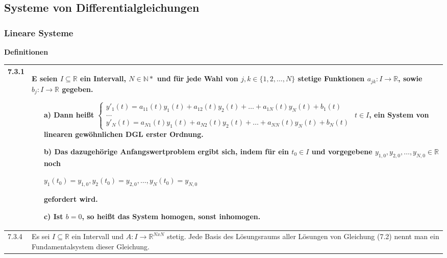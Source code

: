 \subsection{Systeme von Differentialgleichungen}
\subsubsection{Lineare Systeme}

    \noindent
    \textbf{Definitionen}
      
    \begin{longtable}{p{1cm} p{16cm}}
        \toprule

        7.3.1 & E seien $I \subseteq  \mathbb{R}$ ein Intervall, $N \in \mathbb{N*}$ und für jede Wahl von $j,k \in \{1,2,\dots,N\}$ 
            stetige Funktionen $a_{jk}: I \rightarrow \mathbb{R}$, sowie $b_j: I \rightarrow \mathbb{R}$ gegeben. 
            \begin{itemize}[topsep=-0.5cm]
                \item[a)] Dann heißt \hfill \break
                            $\begin{cases}
                                y'_1(t) = a_{11}(t)y_1(t) + a_{12}(t)y_2(t) + \dots + a_{1N}(t)y_N(t) + b_1(t) \\
                                \dots \\
                                y'_N(t) = a_{N1}(t)y_1(t) + a_{N2}(t) y_2(t) + \dots + a_{NN}(t)y_N(t) + b_N(t)
                            \end{cases}$
                            $t\in I$, ein \textbf{System von linearen gewöhnlichen DGL erster Ordnung.}
                \item[b)] Das dazugehörige Anfangswertproblem ergibt sich, indem für ein $t_0 \in I$ und vorgegebene
                            $y_{1,0},y_{2,0},\dots,y_{N,0} \in \mathbb{R}$ noch \hfill \break
                            \centerline{$ y_1(t_0) = y_{1,0}, y_2(t_0) = y_{2,0}, \dots, y_N(t_0)=y_{N,0} $}
                            gefordert wird.
                \item[c)] Ist $b= 0$, so heißt das System homogen, sonst inhomogen.
            \end{itemize} \vspace{-0cm} \\
        \midrule
        7.3.4 & Es sei $I \subseteq \mathbb{R}$ ein Intervall und $A:I \rightarrow \mathbb{R}^{NxN}$ stetig. Jede Basis des Lösungsraums aller
                Lösungen von Gleichung (7.2) nennt man ein Fundamentalsystem dieser Gleichung. \\

        \bottomrule

    \end{longtable}
    

